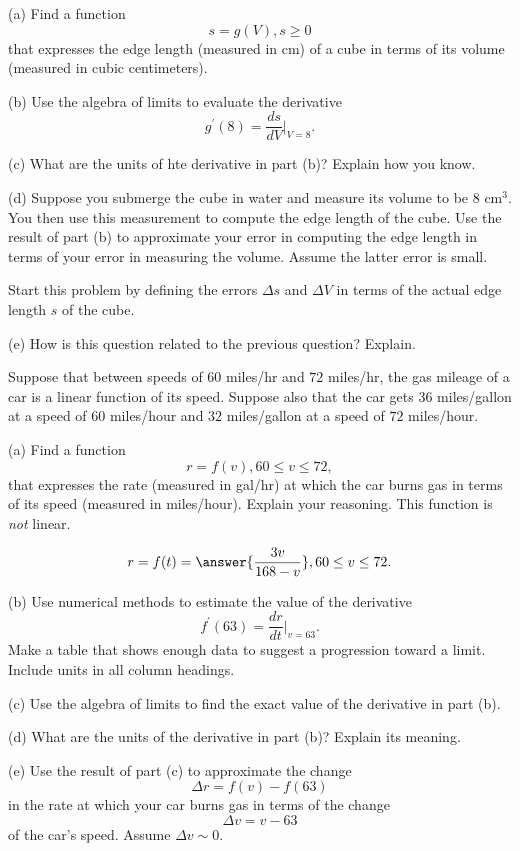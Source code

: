 \documentclass{ximera}
\begin{document}
\begin{question}  \label{Qd9fsd0g}
(a) Find a function 
\[
   s = g(V) , s\geq 0
\]
that expresses the edge length (measured in cm) of a cube in terms of its volume (measured in cubic centimeters).

(b) Use the algebra of limits to evaluate the derivative
\[
       g^\prime(8) = \frac{ds}{dV}\Big|_{V=8}.
\]

(c) What are the units of hte derivative in part (b)? Explain how you know.

(d) Suppose you submerge the cube in water and measure its volume to be $8\text{ cm}^3$. You then use this measurement to compute the edge length of the cube. Use the result of part (b) to approximate your error in computing the edge length in terms of your error in measuring the volume. Assume the latter error is small. 

Start this problem by defining the errors $\Delta s$ and $\Delta V$ in terms of the actual edge length $s$ of the cube.

(e) How is this question related to the previous question? Explain.

\end{question}




\begin{question}  \label{Q354rertb}
Suppose that between speeds of $60$ miles/hr and $72$ miles/hr, the gas mileage of a car is a linear function of its speed. Suppose also that the car gets $36$ miles/gallon at a speed of $60$ miles/hour and $32$ miles/gallon at a speed of $72$ miles/hour.

(a) Find a function
\[
    r = f(v) , 60\leq v \leq 72 ,
\]
that expresses the rate (measured in gal/hr) at which the car burns gas in terms of its speed (measured in miles/hour). Explain your reasoning. This function is \emph{not} linear.
\begin{hint}
\[
        r = f(t) = \answer{\frac{3v}{168-v}} , 60\leq v \leq 72 .
\]
\end{hint}

(b) Use numerical methods to estimate the value of the derivative
\[
    f^\prime(63) = \frac{dr}{dt}\Big|_{v=63} .
\]
Make a table that shows enough data to suggest a progression toward a limit. Include units in all column headings.

(c) Use the algebra of limits to find the exact value of the derivative in part (b). 

(d) What are the units of the derivative in part (b)? Explain its meaning.

(e) Use the result of part (c) to approximate the change 
\[
       \Delta r = f(v) - f(63)
\]
in the rate at which your car burns gas in terms of the change
\[
     \Delta v = v - 63
\]
of the car's speed. Assume $\Delta v \sim 0$.

\end{question}
\end{document}

